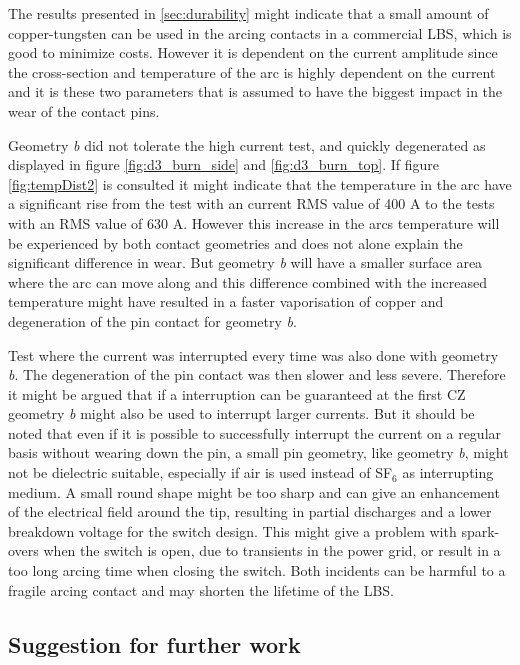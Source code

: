 \documentclass[10pt,a4paper,twoside]{article}
\begin{document}
The results presented in \ref{sec:durability} might indicate that a small amount of copper-tungsten can be used in the arcing contacts in a commercial LBS, which is good to minimize costs. However it is dependent on the current amplitude since the cross-section and temperature of the arc is highly dependent on the current and it is these two parameters that is assumed to have the biggest impact in the wear of the contact pins. 

Geometry \textit{b} did not tolerate the high current test, and quickly degenerated as displayed in figure \ref{fig:d3_burn_side} and \ref{fig:d3_burn_top}. If figure \ref{fig:tempDist2} is consulted it might indicate that the temperature in the arc have a significant rise from the test with an current RMS value of 400 A to the tests with an RMS value of 630 A. However this increase in the arcs temperature will be experienced by both contact geometries and does not alone explain the significant difference in wear. But geometry \textit{b} will have a smaller surface area where the arc can move along and this difference combined with the increased temperature might have resulted in a faster vaporisation of copper and degeneration of the pin contact for geometry \textit{b}.

Test where the current was interrupted every time was also done with geometry \textit{b}. The degeneration of the pin contact was then slower and less severe. Therefore it might be argued that if a interruption can be guaranteed at the first CZ geometry \textit{b} might also be used to interrupt larger currents. But it should be noted that even if it is possible to successfully interrupt the current on a regular basis without wearing down the pin, a small pin geometry, like geometry \textit{b}, might not be dielectric suitable, especially if air is used instead of SF$_6$ as interrupting medium. A small round shape might be too sharp and can give an enhancement of the electrical field around the tip, resulting in partial discharges and a lower breakdown voltage for the switch design. This might give a problem with spark-overs when the switch is open, due to transients in the power grid, or result in a too long arcing time when closing the switch. Both incidents can be harmful to a fragile arcing contact and may shorten the lifetime of the LBS.
\newpage
\subsection{Suggestion for further work}
\end{document}
